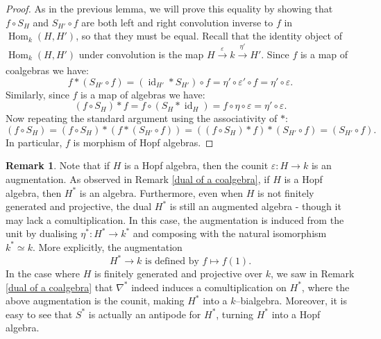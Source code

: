 \documentclass{article}
\theoremstyle{plain}
\theoremstyle{definition}
\newtheorem{Rem}[Th]{Remark}
\DeclareMathOperator{\id}{id}
\DeclareMathOperator{\Hom}{Hom}
\begin{document}
\begin{proof}
    As in the previous lemma, we will prove this equality by showing that $f \circ S_H$ and $ S_{H'}\circ f$ are both left and right convolution inverse to $f$ in $\Hom_k(H, H')$, so that they must be equal. Recall that the identity object of $\Hom_k(H, H')$ under convolution is the map $H\xrightarrow[]{\varepsilon} k \xrightarrow[]{\eta'} H'$. Since $f$ is a map of coalgebras we have: 
    \[
    f \ast (S_{H'} \circ f)=(\id_{H'} \ast S_{H'}) \circ f =  \eta' \circ \varepsilon' \circ f = \eta' \circ \varepsilon.
    \]
    Similarly, since $f$ is a map of algebras we have: 
    \[
    (f \circ S_H) \ast f = f \circ (S_{H} \ast \id_H) = f \circ \eta \circ \varepsilon = \eta' \circ \varepsilon.
    \]
    Now repeating the standard argument using the associativity of $\ast$: 
    \[
    (f \circ S_H)=(f \circ S_H) \ast (f \ast (S_{H'} \circ f))=((f \circ S_H) \ast f) \ast (S_{H'} \circ f) = (S_{H'} \circ f).
    \]
    In particular, $f$ is morphism of Hopf algebras.   
\end{proof}



\begin{Rem}\label{dual of a Hopf algebra}
   Note that if $H$ is a Hopf algebra, then the counit $\varepsilon\colon  H \to k$ is an augmentation. As observed in Remark \ref{dual of a coalgebra}, if $H$ is a Hopf algebra, then $H^\ast$ is an algebra. Furthermore, even when $H$ is not finitely generated and projective, the dual $H^\ast$ is still an augmented algebra - though it may lack a comultiplication. In this case, the augmentation is induced from the unit by dualising $\eta^\ast\colon  H^\ast \to k^\ast$ and composing with the natural isomorphism $k^\ast \simeq k$. More explicitly, the augmentation
    \[
    H^*\to k \mbox{ is defined by } f\mapsto f(1). 
    \]
     In the case where $H$ is finitely generated and projective over $k$, we saw in Remark \ref{dual of a coalgebra} that $\nabla^*$ indeed induces a comultiplication on  $H^\ast$, where the above augmentation is the counit, making $H^\ast$ into a $k$--bialgebra. Moreover, it is easy to see that $S^*$ is actually an antipode for $H^\ast$, turning $H^\ast$ into a Hopf algebra.
\end{Rem}
\end{document}

